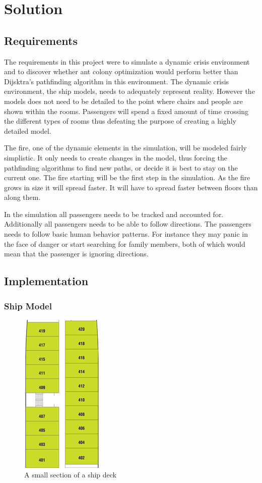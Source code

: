 \chapter{Solution}
\label{ch:solution}

\section{Requirements}

The requirements in this project were to simulate a dynamic crisis environment and to discover whether ant colony optimization would perform better than Dijsktra's pathfinding algorithm in this environment. The dynamic crisis environment, the ship models, needs to adequately represent reality. However the models does not need to be detailed to the point where chairs and people are shown within the rooms. Passengers will spend a fixed amount of time crossing the different types of rooms thus defeating the purpose of creating a highly detailed model. 

The fire, one of the dynamic elements in the simulation, will be modeled fairly simplistic. It only needs to create changes in the model, thus forcing the pathfinding algorithms to find new paths, or decide it is best to stay on the current one. The fire starting will be the first step in the simulation. As the fire grows in size it will spread faster. It will have to spread faster between floors than along them. 

In the simulation all passengers needs to be tracked and accounted for. Additionally all passengers needs to be able to follow directions. The passengers needs to follow basic human behavior patterns. For instance they may panic in the face of danger or start searching for family members, both of which would mean that the passenger is ignoring directions.

\section{Implementation}

\subsection{Ship Model}

\begin{figure} [h]
\centering
\includegraphics[angle=90]{images/rooms.png}
\caption{A small section of a ship deck}
\label{fig:rooms}
\end{figure}

